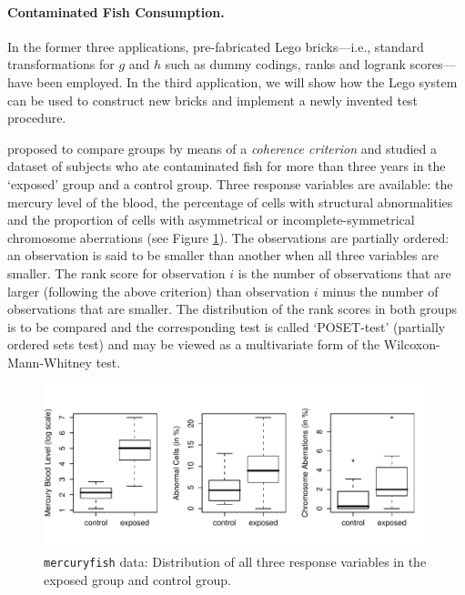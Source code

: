 \documentclass{article}
\newcommand{\Robject}[1]{\texttt{#1}}
\begin{document}
\paragraph{Contaminated Fish Consumption.}

In the former three applications, pre-fabricated Lego bricks---i.e.,
standard transformations for $g$ and $h$ such as dummy codings, ranks
and logrank scores---have been employed.
In the third application, we will show how the Lego system can be used
to construct new bricks and implement a newly invented test procedure. 

\cite{Rosenbaum1994a} proposed to compare groups by means of a
\textit{coherence criterion} and studied a dataset of subjects 
who ate contaminated fish for more than three years in
the `exposed' group and a control group. Three response variables are
available: the mercury level of the blood, the percentage of cells with
structural abnormalities and the proportion of cells with asymmetrical or
incomplete-symmetrical chromosome aberrations (see Figure \ref{mercurybox}). 
The observations are partially
ordered: an observation is said to be smaller than another when all three variables
are smaller. The rank score for observation $i$ is the number of
observations that are larger (following the above criterion) 
than observation $i$ minus the number of
observations that are smaller. The
distribution of the rank scores in both groups is to be compared and
the corresponding test is called `POSET-test' (partially ordered
sets test) and may be viewed as a multivariate form of the
Wilcoxon-Mann-Whitney test.

\begin{figure}
\begin{center}
\includegraphics{LegoCondInf-mercuryfish-plot}
\caption{\Robject{mercuryfish} data: 
         Distribution of all three response variables in the exposed group
         and control group. \label{mercurybox}}
\end{center}
\end{figure}
\end{document}
